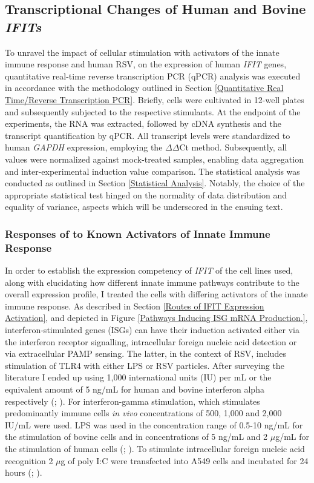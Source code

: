 \subsection{Transcriptional Changes of Human and Bovine \textit{IFITs}} \label{Transcriptional Changes of Human and Bovine \textit{IFITs}}
To unravel the impact of cellular stimulation with activators of the innate immune response and human RSV, on the expression of human \textit{IFIT} genes, quantitative real-time reverse transcription PCR (qPCR) analysis was executed in accordance with the methodology outlined in Section \ref{Quantitative Real Time/Reverse Transcription PCR}. Briefly, cells were cultivated in 12-well plates and subsequently subjected to the respective stimulants. At the endpoint of the experiments, the RNA was extracted, followed by cDNA synthesis and the transcript quantification by qPCR. All transcript levels were standardized to human \textit{GAPDH} expression, employing  the 
\(\Delta\)\(\Delta\)Ct method. Subsequently, all values were normalized against mock-treated samples, enabling data aggregation and inter-experimental induction value comparison. The statistical analysis was conducted as outlined in Section \ref{Statistical Analysis}. Notably, the choice of the appropriate statistical test hinged on the normality of data distribution and equality of variance, aspects which will be underscored in the ensuing text.



\subsubsection{Responses of to Known Activators of Innate Immune Response} \label{Responses to Known Activators of Innate Immune Response}
In order to establish the expression competency of \textit{IFIT} of the cell lines used, along with elucidating how different innate immune pathways contribute to the overall expression profile, I treated the cells with differing activators of the innate immune response. As described in Section \ref{Routes of IFIT Expression Activation}, and depicted in Figure \ref{Pathways Inducing ISG mRNA Production.},  interferon-stimulated genes (ISGs) can have their induction activated either via the interferon receptor signalling, intracellular foreign nucleic acid detection or via extracellular PAMP sensing. The latter, in the context of RSV, includes stimulation of TLR4 with either LPS or RSV particles. After surveying the literature I ended up using 1,000 international units (IU) per mL or the equivalent amount of 5 ng/mL for human and bovine interferon alpha respectively (\cite{Terenzi2006DistinctISG56}; \cite{Santhakumar2018ChickenViruses}). For interferon-gamma stimulation, which stimulates predominantly immune cells \textit{in vivo} concentrations of 500, 1,000 and 2,000 IU/mL were used. LPS was used in the concentration range of 0.5-10 ng/mL for the stimulation of bovine cells and in concentrations of 5 ng/mL and 2 \(\mu\)g/mL for the stimulation of human cells (\cite{Mears2019Ifit1Cells}; \cite{Zhang2019GrouperResponse}). To stimulate intracellular foreign nucleic acid recognition 2 \(\mu\)g of poly I:C were transfected into A549 cells and incubated for 24 hours (\cite{Mears2019Ifit1Cells}; \cite{Palchetti2015TransfectedCells}).

